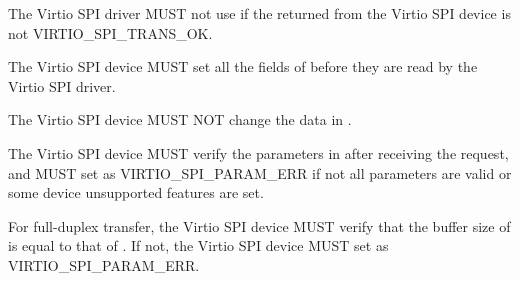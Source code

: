 The Virtio SPI driver MUST not use  if the  returned from the Virtio SPI device is
not VIRTIO_SPI_TRANS_OK.


The Virtio SPI device MUST set all the fields of  before they are
read by the Virtio SPI driver.

The Virtio SPI device MUST NOT change the data in .

The Virtio SPI device MUST verify the parameters in  after receiving
the request, and MUST set  as VIRTIO_SPI_PARAM_ERR if not all
parameters are valid or some device unsupported features are set.

For full-duplex transfer, the Virtio SPI device MUST verify that the buffer size of  is equal to
that of . If not, the Virtio SPI device MUST set 
as VIRTIO_SPI_PARAM_ERR.
